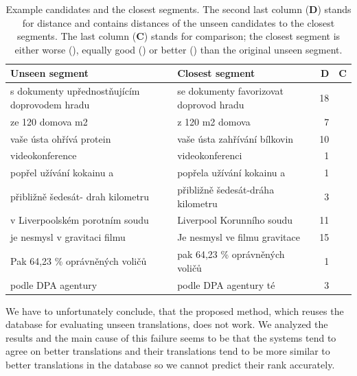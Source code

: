 \begin{table}
  \begin{center}
    \begin{tabular}{|p{5.5cm}p{5.5cm}rc|}
      \hline
      \textbf{Unseen segment} & \textbf{Closest segment} & \textbf{D} & \textbf{C} \\
      \hline
      s dokumenty upřednostňujícím doprovodem hradu & se dokumenty favorizovat doprovod hradu & 18 & \worse{} \\ \hline
      ze 120 domova m2 & z 120 m2 domova & 7 & \better{} \\ \hline
      vaše ústa ohřívá protein & vaše ústa zahřívání bílkovin & 10 & \better{} \\ \hline
      videokonference & videokonferenci & 1 & \better{} \\ \hline
      popřel užívání kokainu a & popřela užívání kokainu a & 1 & \worse{} \\ \hline
      přibližně šedesát- drah kilometru & přibližně šedesát-dráha kilometru & 3 & \equal{} \\ \hline
      v Liverpoolském porotním soudu & Liverpool Korunního soudu & 11 & \better{} \\ \hline
      je nesmysl v gravitaci filmu & Je nesmysl ve filmu gravitace & 15 & \better{} \\ \hline
      Pak 64,23 \% oprávněných voličů & pak 64,23 \% oprávněných voličů & 1 & \better{} \\ \hline
      podle DPA agentury & podle DPA agentury té & 3 & \worse{} \\ \hline
    \end{tabular}
  \end{center}

  \caption[Example candidates and the closest segments]{ Example candidates and
    the closest segments. The second last column (\textbf{D}) stands for
    distance and contains distances of the unseen candidates to the closest
    segments. The last column (\textbf{C}) stands for comparison; the closest
  segment is either worse (\worse{}), equally good (\equal{}) or better
(\better{}) than the original unseen segment.}

  \label{segments-closest}
\end{table}

We have to unfortunately conclude, that the proposed method, which reuses the
database for evaluating unseen translations, does not work. We analyzed the
results and the main cause of this failure seems to be that the systems tend to
agree on better translations and their translations tend to be more similar to
better translations in the database so we cannot predict their rank accurately. 

